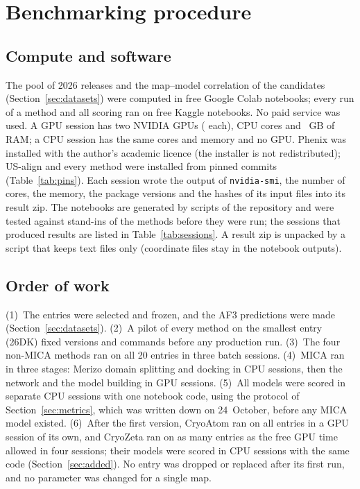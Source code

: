\section{Benchmarking procedure}\label{sec:procedure}

\subsection{Compute and software}
The pool of 2026 releases and the map--model correlation of the candidates (Section~\ref{sec:datasets}) were computed in free Google Colab notebooks; every run of a method and all scoring ran on free Kaggle notebooks. No paid service was used. A GPU session has two NVIDIA \GpuName{} GPUs (\GpuMemory{} each), \CpuCores{} CPU cores and \RamGb{}~GB of RAM; a CPU session has the same cores and memory and no GPU. Phenix \PhenixVersion{} was installed with the author's academic licence (the installer is not redistributed); US-align and every method were installed from pinned commits (Table~\ref{tab:pins}). Each session wrote the output of \texttt{nvidia-smi}, the number of cores, the memory, the package versions and the hashes of its input files into its result zip. The notebooks are generated by scripts of the repository and were tested against stand-ins of the methods before they were run; the sessions that produced results are listed in Table~\ref{tab:sessions}. A result zip is unpacked by a script that keeps text files only (coordinate files stay in the notebook outputs).

\subsection{Order of work}
(1)~The entries were selected and frozen, and the AF3 predictions were made (Section~\ref{sec:datasets}). (2)~A pilot of every method on the smallest entry (26DK) fixed versions and commands before any production run. (3)~The four non-MICA methods ran on all 20 entries in three batch sessions. (4)~MICA ran in three stages: Merizo domain splitting and docking in CPU sessions, then the network and the model building in GPU sessions. (5)~All models were scored in separate CPU sessions with one notebook code, using the protocol of Section~\ref{sec:metrics}, which was written down on 24~October, before any MICA model existed. (6)~After the first version, CryoAtom ran on all \NEntries{} entries in a GPU session of its own, and CryoZeta ran on as many entries as the free GPU time allowed in four sessions; their models were scored in CPU sessions with the same code (Section~\ref{sec:added}). No entry was dropped or replaced after its first run, and no parameter was changed for a single map.

